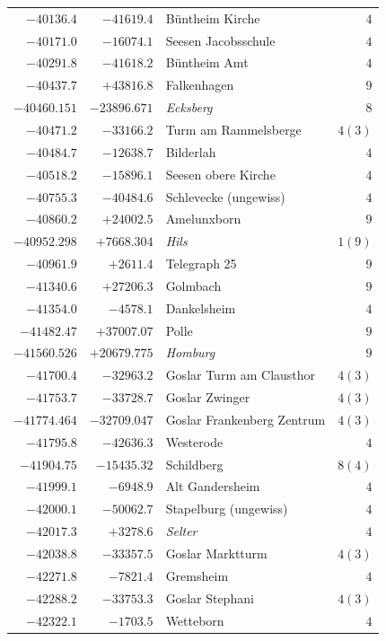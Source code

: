 \begin{center}
\begin{tabular}{r|r|p{170pt}|r}
\(-40136.4\)&\(-41619.4\)&Büntheim Kirche&\(4\)\\
\(-40171.0\)&\(-16074.1\)&Seesen Jacobsschule&\(4\)\\
\(-40291.8\)&\(-41618.2\)&Büntheim Amt&\(4\)\\
\(-40437.7\)&\(+43816.8\)&Falkenhagen&\(9\)\\
\(-40460.151\)&\(-23896.671\)&\textit{Ecksberg}&\(8\)\\
\(-40471.2\)&\(-33166.2\)&Turm am Rammelsberge&\(4 (3)\)\\
\(-40484.7\)&\(-12638.7\)&Bilderlah&\(4\)\\
\(-40518.2\)&\(-15896.1\)&Seesen obere Kirche&\(4\)\\
\(-40755.3\)&\(-40484.6\)&Schlevecke (ungewiss)&\(4\)\\
\(-40860.2\)&\(+24002.5\)&Amelunxborn&\(9\)\\
\(-40952.298\)&\(+7668.304\)&\textit{Hils}&\(1 (9)\)\\
\(-40961.9\)&\(+2611.4\)&Telegraph 25&\(9\)\\
\(-41340.6\)&\(+27206.3\)&Golmbach&\(9\)\\
\(-41354.0\)&\(-4578.1\)&Dankelsheim&\(4\)\\
\(-41482.47\)&\(+37007.07\)&Polle&\(9\)\\
\(-41560.526\)&\(+20679.775\)&\textit{Homburg}&\(9\)\\
\(-41700.4\)&\(-32963.2\)&Goslar Turm am Clausthor&\(4 (3)\)\\
\(-41753.7\)&\(-33728.7\)&Goslar Zwinger&\(4 (3)\)\\
\(-41774.464\)&\(-32709.047\)&Goslar Frankenberg Zentrum&\(4 (3)\)\\
\(-41795.8\)&\(-42636.3\)&Westerode&\(4\)\\
\(-41904.75\)&\(-15435.32\)&Schildberg&\(8 (4)\)\\
\(-41999.1\)&\(-6948.9\)&Alt Gandersheim&\(4\)\\
\(-42000.1\)&\(-50062.7\)&Stapelburg (ungewiss)&\(4\)\\
\(-42017.3\)&\(+3278.6\)&\textit{Selter}&\(4\)\\
\(-42038.8\)&\(-33357.5\)&Goslar Marktturm&\(4 (3)\)\\
\(-42271.8\)&\(-7821.4\)&Gremsheim&\(4\)\\
\(-42288.2\)&\(-33753.3\)&Goslar Stephani&\(4 (3)\)\\
\(-42322.1\)&\(-1703.5\)&Wetteborn&\(4\)\\
\hline\end{tabular}\endgroup\end{center}
